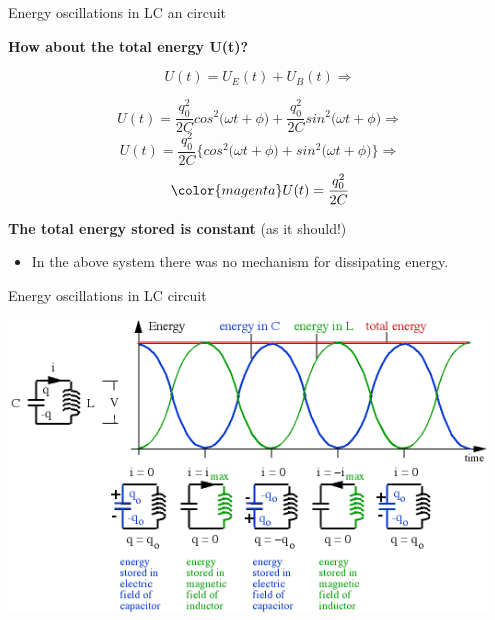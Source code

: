 \begin{frame}{Energy oscillations in LC an circuit}

{\bf How about the total energy U(t)?}

\begin{equation*}
  U(t) = U_E(t) + U_B(t) \Rightarrow
\end{equation*}

\begin{equation*}
  U(t) = \frac{q_0^2}{2C} cos^{2}\Big( \omega t + \phi \Big) +
            \frac{q_0^2}{2C} sin^{2}\Big( \omega t + \phi \Big) \Rightarrow
\end{equation*}
\begin{equation*}
  U(t) = \frac{q_0^2}{2C} \Big\{ cos^{2}\Big( \omega t + \phi \Big) + sin^2\Big( \omega t + \phi \Big) \Big\} \Rightarrow
\end{equation*}
\begin{equation*}
{\color{magenta}
  U(t) = \frac{q_0^2}{2C}
}
\end{equation*}

{\bf The total energy stored is constant} (as it should!)\\
\begin{itemize}
    \item In the above system there was no mechanism for dissipating energy.
\end{itemize}

\end{frame}


%
%
%

\begin{frame}{Energy oscillations in LC circuit}

\begin{center}
     \includegraphics[width=0.95\textwidth]{./images/schematics/LC_oscillations_2.png}\\
\end{center}

\end{frame}

